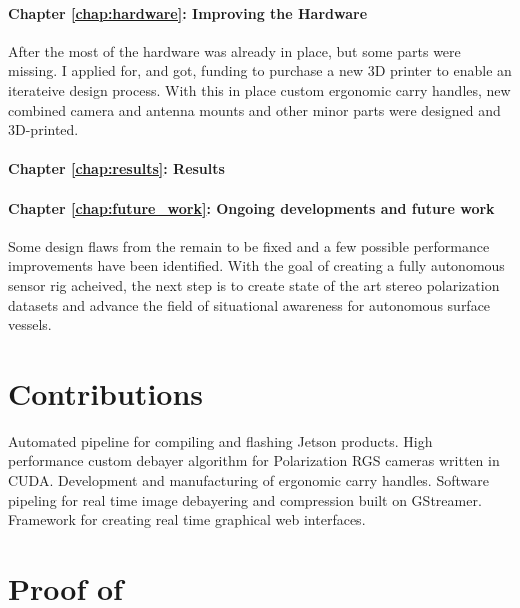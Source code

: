\paragraph{Chapter \ref{chap:hardware}: Improving the Hardware}
After the \preproject most of the hardware was already in place, but some parts were missing.
I applied for, and got, funding to purchase a new 3D printer to enable an iterateive design process.
With this in place custom ergonomic carry handles, new combined camera and antenna mounts and other minor parts were designed and 3D-printed.

\paragraph{Chapter \ref{chap:results}: Results}


\paragraph{Chapter \ref{chap:future_work}: Ongoing developments and future work}
Some design flaws from the \preproject remain to be fixed and a few possible performance improvements have been identified.
With the goal of creating a fully autonomous sensor rig acheived, the next step is to create state of the art stereo polarization datasets and advance the field of situational awareness for autonomous surface vessels.


\section{Contributions}
Automated pipeline for compiling and flashing Jetson products.
High performance custom debayer algorithm for Polarization RGS cameras written in CUDA.
Development and manufacturing of ergonomic carry handles.
Software pipeling for real time image debayering and compression built on GStreamer.
Framework for creating real time graphical web interfaces.

\section{Proof of }
